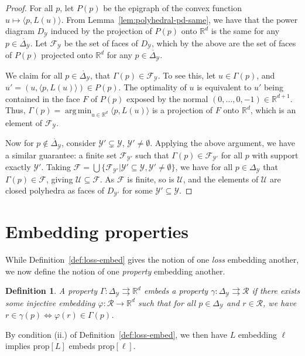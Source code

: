 \documentclass[11pt]{article}
\newcommand{\reals}{\mathbb{R}}
\newcommand{\prop}[1]{\mathrm{prop}[#1]}
\newcommand{\simplex}{\Delta_\Y}
\newcommand{\F}{\mathcal{F}}
\newcommand{\R}{\mathcal{R}}
\newcommand{\U}{\mathcal{U}}
\newcommand{\Y}{\mathcal{Y}}
\newcommand{\inprod}[2]{\langle #1, #2 \rangle}%
\newcommand{\inter}[1]{\mathring{#1}}%
\newcommand{\toto}{\rightrightarrows}
\DeclareMathOperator*{\argmin}{arg\,min}
\newtheorem{definition}{Definition}
\begin{document}
\polyhedralrangegamma*
\begin{proof}
	For all $p$, let $P(p)$ be the epigraph of the convex function $u\mapsto \inprod{p}{L(u)}$.
	From Lemma~\ref{lem:polyhedral-pd-same}, we have that the power diagram $D_\Y$ induced by the projection of $P(p)$ onto $\reals^d$ is the same for any $p\in\inter\simplex$.
	Let $\F_\Y$ be the set of faces of $D_\Y$, which by the above are the set of faces of $P(p)$ projected onto $\reals^d$ for any $p\in\inter\simplex$.
	
	We claim for all $p\in\inter\simplex$, that $\Gamma(p) \in \F_\Y$.
	To see this, let $u \in \Gamma(p)$, and $u' = (u,\inprod{p}{L(u)}) \in P(p)$.
	The optimality of $u$ is equivalent to $u'$ being contained in the face $F$ of $P(p)$ exposed by the normal $(0,\ldots,0,-1)\in\reals^{d+1}$.
	Thus, $\Gamma(p) = \argmin_{u\in\reals^d} \inprod{p}{L(u)}$ is a projection of $F$ onto $\reals^d$, which is an element of $\F_\Y$.
	
	Now for $p \not \in \inter{\simplex}$, consider $\Y'\subsetneq \Y$, $\Y'\neq\emptyset$.
	Applying the above argument, we have a similar guarantee: a finite set $\F_{\Y'}$ such that $\Gamma(p) \in \F_{\Y'}$ for all $p$ with support exactly $\Y'$.
	Taking $\F = \bigcup\{\F_{\Y'} | \Y'\subseteq\Y, \Y'\neq\emptyset\}$, we have for all $p\in\simplex$ that $\Gamma(p) \in \F$, giving $\U \subseteq \F$.
	As $\F$ is finite, so is $\U$, and the elements of $\U$ are closed polyhedra as faces of $D_{\Y'}$ for some $\Y'\subseteq\Y$.
\end{proof}


\section{Embedding properties}\label{app:embed-props}

While Definition~\ref{def:loss-embed} gives the notion of one \emph{loss} embedding another, we now define the notion of one \emph{property} embedding another.
\begin{definition}\label{def:prop-embed}
	A property $\Gamma : \simplex \toto \reals^d$ embeds a property $\gamma:\simplex \toto \R$ if there exists some injective embedding $\varphi:\R \to \reals^d$ such that for all $p \in \simplex$ and $r \in \R$, we have $r \in \gamma(p) \iff \varphi(r) \in \Gamma(p)$.
\end{definition}

By condition (ii.) of Definition~\ref{def:loss-embed}, we then have $L$ embedding $\ell$ implies $\prop{L}$ embeds $\prop{\ell}$.
\end{document}
